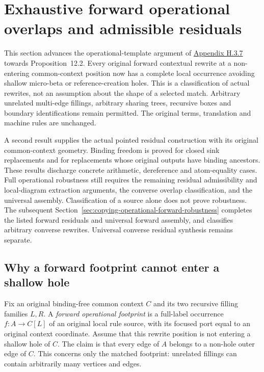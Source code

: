 \clearpage
\section{Exhaustive forward operational overlaps and admissible residuals}
\label{sec:copying-forward-overlaps}
This section advances the operational-template argument of
\href{https://arxiv.org/html/1907.01257v5\#A8.SS3.SSS7}{Appendix H.3.7}
towards Proposition~12.2. Every original forward contextual rewrite at a non-entering common-context
position now has a complete local occurrence avoiding shallow micro-beta or
reference-creation holes. This is a classification of actual rewrites, not an assumption about
the shape of a selected match. Arbitrary unrelated multi-edge fillings,
arbitrary sharing trees, recursive boxes and boundary identifications remain
permitted. The original terms, translation and machine rules are unchanged.

A second result supplies the actual pointed residual construction with its
original common-context geometry. Binding freedom is proved for closed sink
replacements and for replacements whose original outputs have binding
ancestors. These results discharge concrete arithmetic, dereference and
atom-equality cases. Full operational robustness still requires the remaining
residual admissibility and local-diagram extraction arguments, the converse
overlap classification, and the universal assembly. Classification of a
source alone does not prove robustness. The subsequent
Section~\ref{sec:copying-operational-forward-robustness} completes the listed
forward residuals and universal forward assembly, and classifies arbitrary
converse rewrites. Universal converse residual synthesis remains separate.

\subsection{Why a forward footprint cannot enter a shallow hole}
Fix an original binding-free common context $C$ and its two recursive filling
families $L,R$. A \emph{forward operational footprint} is a full-label
occurrence $f:A\to C[L]$ of an original local rule source, with its focused
port equal to an original context coordinate. Assume that this rewrite
position is not entering a shallow hole of $C$. The claim is that every edge
of $A$ belongs to a non-hole outer edge of $C$. This concerns only the matched
footprint: unrelated fillings can contain arbitrarily many vertices and edges.

